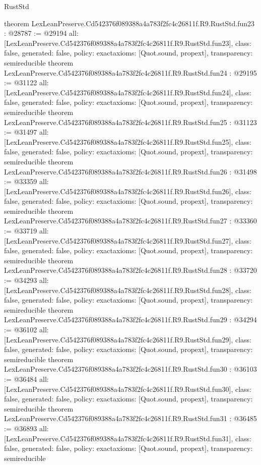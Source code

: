 \begin{lexlean}{RustStd}
\begin{coremodule}
{}
theorem LexLeanPreserve.Cd542376f089388a4a783f2fc4c26811f.R9.RustStd.fun23 : @28787 := @29194 {
  all: [LexLeanPreserve.Cd542376f089388a4a783f2fc4c26811f.R9.RustStd.fun23],
  class: false,
  generated: false,
  policy: exact{axioms: [Quot.sound, propext]},
  transparency: semireducible
}
theorem LexLeanPreserve.Cd542376f089388a4a783f2fc4c26811f.R9.RustStd.fun24 : @29195 := @31122 {
  all: [LexLeanPreserve.Cd542376f089388a4a783f2fc4c26811f.R9.RustStd.fun24],
  class: false,
  generated: false,
  policy: exact{axioms: [Quot.sound, propext]},
  transparency: semireducible
}
theorem LexLeanPreserve.Cd542376f089388a4a783f2fc4c26811f.R9.RustStd.fun25 : @31123 := @31497 {
  all: [LexLeanPreserve.Cd542376f089388a4a783f2fc4c26811f.R9.RustStd.fun25],
  class: false,
  generated: false,
  policy: exact{axioms: [Quot.sound, propext]},
  transparency: semireducible
}
theorem LexLeanPreserve.Cd542376f089388a4a783f2fc4c26811f.R9.RustStd.fun26 : @31498 := @33359 {
  all: [LexLeanPreserve.Cd542376f089388a4a783f2fc4c26811f.R9.RustStd.fun26],
  class: false,
  generated: false,
  policy: exact{axioms: [Quot.sound, propext]},
  transparency: semireducible
}
theorem LexLeanPreserve.Cd542376f089388a4a783f2fc4c26811f.R9.RustStd.fun27 : @33360 := @33719 {
  all: [LexLeanPreserve.Cd542376f089388a4a783f2fc4c26811f.R9.RustStd.fun27],
  class: false,
  generated: false,
  policy: exact{axioms: [Quot.sound, propext]},
  transparency: semireducible
}
theorem LexLeanPreserve.Cd542376f089388a4a783f2fc4c26811f.R9.RustStd.fun28 : @33720 := @34293 {
  all: [LexLeanPreserve.Cd542376f089388a4a783f2fc4c26811f.R9.RustStd.fun28],
  class: false,
  generated: false,
  policy: exact{axioms: [Quot.sound, propext]},
  transparency: semireducible
}
theorem LexLeanPreserve.Cd542376f089388a4a783f2fc4c26811f.R9.RustStd.fun29 : @34294 := @36102 {
  all: [LexLeanPreserve.Cd542376f089388a4a783f2fc4c26811f.R9.RustStd.fun29],
  class: false,
  generated: false,
  policy: exact{axioms: [Quot.sound, propext]},
  transparency: semireducible
}
theorem LexLeanPreserve.Cd542376f089388a4a783f2fc4c26811f.R9.RustStd.fun30 : @36103 := @36484 {
  all: [LexLeanPreserve.Cd542376f089388a4a783f2fc4c26811f.R9.RustStd.fun30],
  class: false,
  generated: false,
  policy: exact{axioms: [Quot.sound, propext]},
  transparency: semireducible
}
theorem LexLeanPreserve.Cd542376f089388a4a783f2fc4c26811f.R9.RustStd.fun31 : @36485 := @36893 {
  all: [LexLeanPreserve.Cd542376f089388a4a783f2fc4c26811f.R9.RustStd.fun31],
  class: false,
  generated: false,
  policy: exact{axioms: [Quot.sound, propext]},
  transparency: semireducible
}
\end{coremodule}
\end{lexlean}
